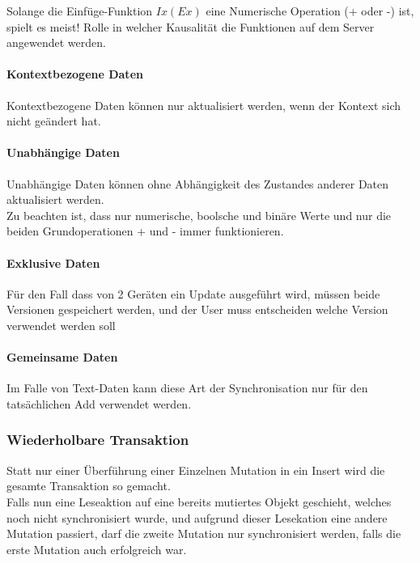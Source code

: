 \documentclass[oneside,11pt,parskip=half,ngerman]{scrreprt}
\begin{document}
Solange die Einfüge-Funktion \(Ix(Ex)\) eine Numerische Operation (+
oder -) ist, spielt es meist! Rolle in welcher Kausalität die Funktionen
auf dem Server angewendet werden.

\paragraph{Kontextbezogene Daten}\label{kontextbezogene-daten}

Kontextbezogene Daten können nur aktualisiert werden, wenn der Kontext
sich nicht geändert hat.

\paragraph{Unabhängige Daten}\label{unabhuxe4ngige-daten}

Unabhängige Daten können ohne Abhängigkeit des Zustandes anderer Daten
aktualisiert werden.\\Zu beachten ist, dass nur numerische, boolsche und
binäre Werte und nur die beiden Grundoperationen + und - immer
funktionieren.

\paragraph{Exklusive Daten}\label{exklusive-daten}

Für den Fall dass von 2 Geräten ein Update ausgeführt wird, müssen beide
Versionen gespeichert werden, und der User muss entscheiden welche
Version verwendet werden soll

\paragraph{Gemeinsame Daten}\label{gemeinsame-daten}

Im Falle von Text-Daten kann diese Art der Synchronisation nur für den
tatsächlichen Add verwendet werden.

\subsubsection{Wiederholbare
Transaktion}\label{wiederholbare-transaktion}

Statt nur einer Überführung einer Einzelnen Mutation in ein Insert wird
die gesamte Transaktion so gemacht.\\Falls nun eine Leseaktion auf eine
bereits mutiertes Objekt geschieht, welches noch nicht synchronisiert
wurde, und aufgrund dieser Lesekation eine andere Mutation passiert,
darf die zweite Mutation nur synchronisiert werden, falls die erste
Mutation auch erfolgreich war.
\end{document}
